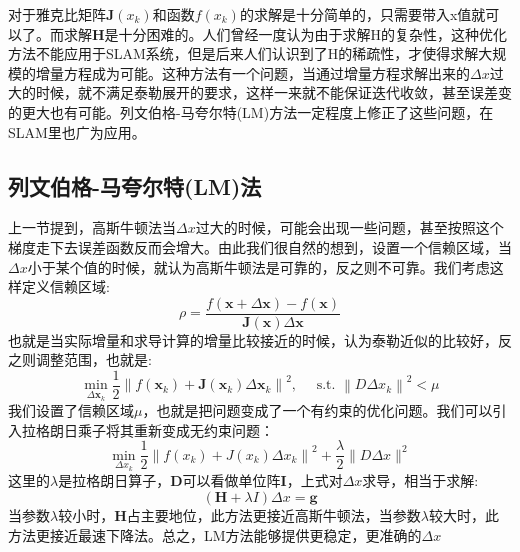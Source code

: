 对于雅克比矩阵$\boldsymbol{J}(x_k)$和函数$f(x_k)$的求解是十分简单的，只需要带入x值就可以了。而求解$\boldsymbol{H}$是十分困难的。人们曾经一度认为由于求解H的复杂性，这种优化方法不能应用于SLAM系统，但是后来人们认识到了H的稀疏性，才使得求解大规模的增量方程成为可能。这种方法有一个问题，当通过增量方程求解出来的$\Delta x$过大的时候，就不满足泰勒展开的要求，这样一来就不能保证迭代收敛，甚至误差变的更大也有可能。列文伯格-马夸尔特(LM)方法一定程度上修正了这些问题，在SLAM里也广为应用。
\subsection{列文伯格-马夸尔特(LM)法}
上一节提到，高斯牛顿法当$\Delta x$过大的时候，可能会出现一些问题，甚至按照这个梯度走下去误差函数反而会增大。由此我们很自然的想到，设置一个信赖区域，当$\Delta x$小于某个值的时候，就认为高斯牛顿法是可靠的，反之则不可靠。我们考虑这样定义信赖区域:
\begin{equation}
\rho=\frac{f(\boldsymbol{x}+\Delta \boldsymbol{x})-f(\boldsymbol{x})}{\boldsymbol{J}(\boldsymbol{x}) \Delta \boldsymbol{x}}
\end{equation}
也就是当实际增量和求导计算的增量比较接近的时候，认为泰勒近似的比较好，反之则调整范围，也就是:
\begin{equation}
\min _{\Delta \boldsymbol{x}_{k}} \frac{1}{2}\left\|f\left(\boldsymbol{x}_{k}\right)+\boldsymbol{J}\left(\boldsymbol{x}_{k}\right) \Delta \boldsymbol{x}_{k}\right\|^{2}, \quad \text { s.t. }\left\|D \Delta x_{k}\right\|^{2} < \mu
\end{equation}
我们设置了信赖区域$\mu$，也就是把问题变成了一个有约束的优化问题。我们可以引入拉格朗日乘子将其重新变成无约束问题：
\begin{equation}
\min _{\Delta x_{k}} \frac{1}{2}\left\|f\left(x_{k}\right)+J\left(x_{k}\right) \Delta x_{k}\right\|^{2}+\frac{\lambda}{2}\|D \Delta x\|^{2}
\end{equation}
这里的$\lambda$是拉格朗日算子，$\boldsymbol{D}$可以看做单位阵$\boldsymbol{I}$，上式对$\Delta x$求导，相当于求解:
\begin{equation}
(\boldsymbol{H}+\lambda I) \Delta x=\boldsymbol{g}
\label{equ:LM}
\end{equation}
当参数$\lambda$较小时，$\boldsymbol{H}$占主要地位，此方法更接近高斯牛顿法，当参数$\lambda$较大时，此方法更接近最速下降法。总之，LM方法能够提供更稳定，更准确的$\Delta x$
